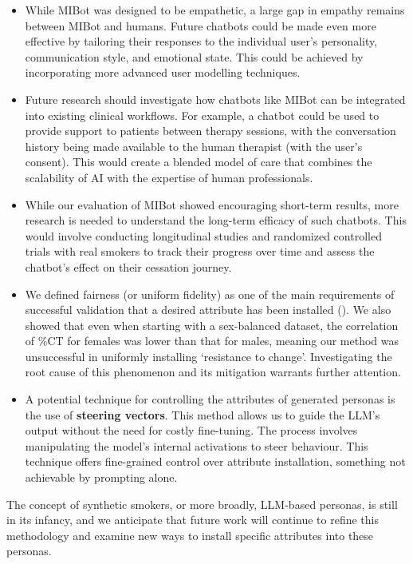 \begin{itemize}
	\item While MIBot was designed to be empathetic, a large gap in empathy remains between MIBot and humans. Future chatbots could be made even more effective by tailoring their responses to the individual user's personality, communication style, and emotional state. This could be achieved by incorporating more advanced user modelling techniques.
	\item Future research should investigate how chatbots like MIBot can be integrated into existing clinical workflows. For example, a chatbot could be used to provide support to patients between therapy sessions, with the conversation history being made available to the human therapist (with the user's consent). This would create a blended model of care that combines the scalability of AI with the expertise of human professionals.
	\item While our evaluation of MIBot showed encouraging short-term results, more research is needed to understand the long-term efficacy of such chatbots. This would involve conducting longitudinal studies and randomized controlled trials with real smokers to track their progress over time and assess the chatbot's effect on their cessation journey.
	\item  We defined fairness (or uniform fidelity) as one of the main requirements of successful validation that a desired attribute has been installed (). We also showed that even when starting with a sex-balanced dataset, the correlation of \%CT for females was lower than that for males, meaning our method was unsuccessful in uniformly installing `resistance to change'. Investigating the root cause of this phenomenon and its mitigation warrants further attention.
	\item A potential technique for controlling the attributes of generated personas is the use of \textbf{steering vectors}. This method allows us to guide the LLM's output without the need for costly fine-tuning. The process involves manipulating the model's internal activations to steer behaviour. This technique offers fine-grained control over attribute installation, something not achievable by prompting alone.
\end{itemize}

The concept of synthetic smokers, or more broadly, LLM-based personas, is still in its infancy, and we anticipate that future work will continue to refine this methodology and examine new ways to install specific attributes into these personas.

